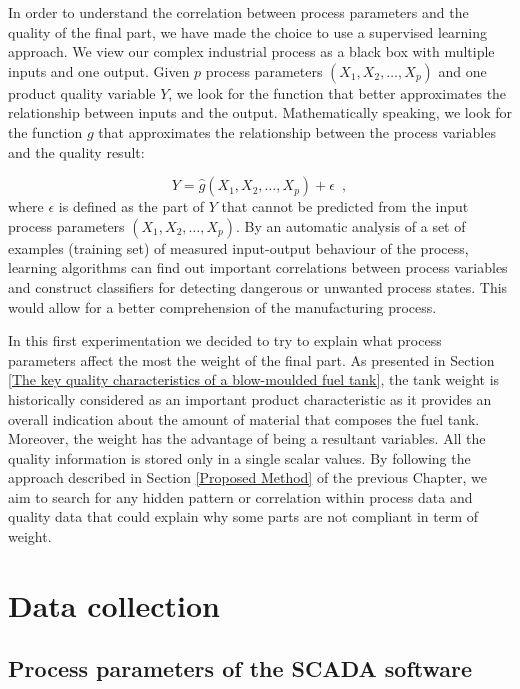 In order to understand the correlation between process parameters and the quality of the final part, we have made the choice to use a supervised learning approach. We view our complex industrial process as a black box with multiple inputs and one output. Given $p$ process parameters $(X_1,X_2,\ldots,X_p)$ and one product quality variable $Y$, we look for the function that better approximates the relationship between inputs and the output. Mathematically speaking, we look for the function $g$ that approximates the relationship between the process variables and the quality result:

\begin{equation}
    Y = \hat{g}(X_1,X_2,\ldots,X_p) + \epsilon
    \enspace,
\end{equation}
%
where $\epsilon$ is defined as the part of $Y$ that cannot be predicted from the input process parameters $(X_1,X_2,\ldots,X_p)$. By an automatic analysis of a set of examples (training set) of measured input-output behaviour of the process, learning algorithms can find out important correlations between process variables and construct classifiers for detecting dangerous or unwanted process states. This would allow for a better comprehension of the manufacturing process.

In this first experimentation we decided to try to explain what process parameters affect the most the weight of the final part. As presented in Section \ref{The key quality characteristics of a blow-moulded fuel tank}, the tank weight is historically considered as an important product characteristic as it provides an overall indication about the amount of material that composes the fuel tank. Moreover, the weight has the advantage of being a resultant variables. All the quality information is stored only in a single scalar values. By following the approach described in Section \ref{Proposed Method} of the previous Chapter, we aim to search for any hidden pattern or correlation within process data and quality data that could explain why some parts are not compliant in term of weight.

\section{Data collection}

\subsection{Process parameters of the SCADA software}

